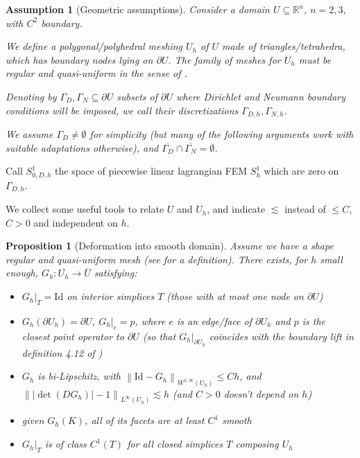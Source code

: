 \documentclass[english,a4paper,9pt,oneside]{scrbook}	%
\theoremstyle{break}
\newtheorem{prop}[equation]{Proposition}
\newtheorem{ass}[equation]{Assumption}
\theoremstyle{remark}
\newcommand{\mR}{\mathbb{R}}
\newcommand{\norm}[1]{\left\lVert#1\right\rVert}
\newcommand{\id}{\text{Id}}
\begin{document}
\begin{appendices}
\begin{ass}[Geometric assumptions]
\label{ass:geo_ass_discr}
Consider a domain $U \subseteq \mR^n$, $n=2,3$, with $C^2$ boundary.

We define a polygonal/polyhedral meshing $U_h$ of $U$ made of triangles/tetrahedra, which has boundary nodes lying on $\partial U$. The family of meshes for $U_h$ must be regular and quasi-uniform in the sense of \cite{brenner_scott}.

Denoting by $\Gamma_D, \Gamma_N \subseteq \partial U$ subsets of $\partial U$ where Dirichlet and Neumann boundary conditions will be imposed, we call their discretizations $\Gamma_{D,h}, \Gamma_{N,h}$.

We assume $\Gamma_D \neq \emptyset $ for simplicity (but many of the following arguments work with suitable adaptations otherwise), and $\overline{\Gamma_D}\cap \overline{\Gamma_N} = \emptyset$.

\end{ass}

Call $S^1_{0,D,h} $ the space of piecewise linear lagrangian FEM $S^1_h$ which are zero on $\Gamma_{D,h}$.

We collect some useful tools to relate $U$ and $U_h$, and indicate $\lesssim$ instead of $\leq C$, $C>0$ and independent on $h$.

\begin{prop}[Deformation into smooth domain]
\label{prop:G_h}
Assume we have a shape regular and quasi-uniform mesh (see \cite{brenner_scott} for a definition). There exists, for $h$ small enough, $G_h: \overline{U_h} \rightarrow \overline{U}$ satisfying:

\begin{itemize}
	\item $G_h|_T = \id$ on interior simplices $T$ (those with at most one node on $\partial U$)
	\item $G_h(\partial U_h) = \partial U$, $G_h|_e=p$, where $e$ is an edge/face of $\partial U_h$ and $p$ is the closest point operator to $\partial U$ (so that $G_h|_{\partial U_h}$ coincides with the boundary lift in definition 4.12 of \cite{elliott})
	\item $G_h$ is bi-Lipschitz, with $\norm{\id -G_h}_{W^{1,\infty}(U_h)}\leq C h$, and $\norm{|\det(DG_h)|-1}_{L^\infty(U_h)}\lesssim h$ (and $C>0$ doesn't depend on $h$)
	\item given $G_h(K)$, all of its facets are at least $C^1$ smooth
	\item $G_h|_T$ is of class $C^1(T)$ for all closed simplices $T$ composing $U_h$
\end{itemize}


\end{prop}
\end{appendices}
\end{document}
